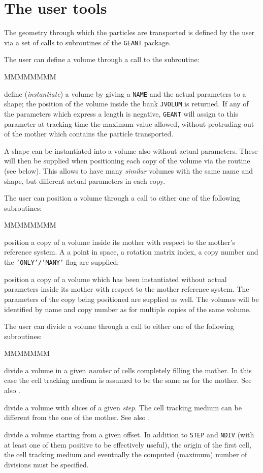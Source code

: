 \section{The user tools }

The geometry through which the particles are transported is defined by the
user via a set of calls to subroutines of the {\tt GEANT} package.

The user can define a volume through a call to the subroutine:
\begin{DLtt}{MMMMMMMM}
\item[\Rind{GSVOLU}] define ({\it instantiate}) a volume by giving a 
{\tt NAME} and the actual parameters to a shape; the position of the volume 
inside the bank {\tt JVOLUM} is returned. If any of the parameters which
express a length is negative, {\tt GEANT} will assign to this parameter
at tracking time
the maximum value allowed, without protruding out of the mother 
which contains the particle transported.

A shape can be instantiated
into a volume also without actual parameters. These will then be supplied
when positioning each copy of the volume via the  routine (see
below). This allows to have many {\it similar} volumes with the same name
and shape, but different actual parameters in each copy.
\end{DLtt}

The user can position a volume through a call to either one of the following 
subroutines:

\begin{DLtt}{MMMMMMMM}
\item[\Rind{GSPOS}] position a copy of a volume inside its mother with respect 
to the mother's reference system. A a point in space, a rotation matrix
index, a copy number and the {\tt 'ONLY'/'MANY'} flag are supplied;
\item[\Rind{GSPOSP}] position a copy of a volume which has been instantiated
without actual parameters inside its mother with respect to the mother reference
system. The parameters of the copy being positioned are supplied as well.
The volumes will be identified by name and copy number as for multiple copies
of the same volume.
\end{DLtt}
The user can divide a volume through a call to either one of the following
subroutines:

\begin{DLtt}{MMMMMMM}
\item[\Rind{GSDVN}] divide a volume in a given {\it number} of cells completely
filling the mother. In this case the cell tracking medium
is assumed to be the same as for the mother. See also .
\item[\Rind{GSDVT}] divide a volume with slices of a given {\it step}.
The cell tracking medium can be different from the one of the mother.
See also .
\item[\Rind{GSDVX}] divide a volume starting from a given offset. In addition 
to {\tt STEP} and {\tt NDIV} (with at least one of them positive to be 
effectively useful), the origin of the first cell, the cell tracking medium 
and eventually the computed (maximum) number of divisions must be specified.
\end{DLtt}


